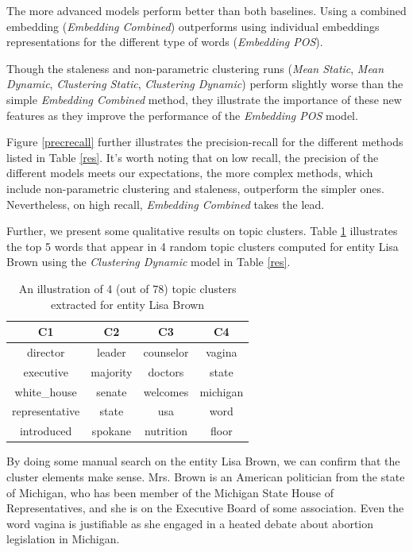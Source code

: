 \documentclass{article}
\begin{document}
The more advanced models perform better than both baselines. Using a combined embedding ({\textit{Embedding Combined}}) outperforms using individual embeddings representations for the different type of words ({\textit{Embedding POS}}).

Though the staleness and non-parametric clustering runs ({\textit{Mean Static}}, {\textit{Mean Dynamic}}, {\textit{Clustering Static}}, {\textit{Clustering Dynamic}}) perform slightly worse than the simple {\textit{Embedding Combined}} method, they illustrate the importance of these new features as they improve the performance of the {\textit{Embedding POS}} model.

Figure \ref{precrecall} further illustrates the precision-recall for the different methods listed in Table \ref{res}. It's worth noting that on low recall, the precision of the different models meets our expectations, the more complex methods, which include non-parametric clustering and staleness, outperform the simpler ones. Nevertheless, on high recall, {\textit{Embedding Combined}} takes the lead.

Further, we present some qualitative results on topic clusters. Table \ref{clusterresult} illustrates the top 5 words that appear in 4 random topic clusters computed for entity Lisa Brown using the \textit{Clustering Dynamic} model in Table \ref{res}.

\begin{table}[H]
\center
\begin{tabular}{|c|c|c|c|} \hline
\textbf{C1} & \textbf{C2} & \textbf{C3} & \textbf{C4} \\ \hline\hline
director & leader & counselor & vagina \\ \hline
executive & majority & doctors & state \\ \hline
white\_house & senate & welcomes & michigan \\ \hline
representative & state & usa & word \\ \hline
introduced & spokane & nutrition & floor \\ \hline
\end{tabular}
\caption{An illustration of 4 (out of 78) topic clusters extracted for entity Lisa Brown}
\label{clusterresult}
\end{table}

By doing some manual search on the entity Lisa Brown, we can confirm that the cluster elements make sense. Mrs. Brown is an American politician from the state of Michigan, who has been member of the Michigan State House of Representatives, and she is on the Executive Board of some association.
Even the word vagina is justifiable as she engaged in a heated debate about abortion legislation in Michigan.
\end{document}
